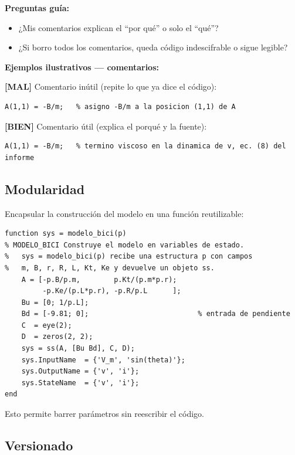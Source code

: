 \documentclass[11pt,a4paper]{article}
\newcommand{\malo}{\textcolor{red!70!black}{\textbf{[MAL]}}}
\newcommand{\bueno}{\textcolor{green!50!black}{\textbf{[BIEN]}}}
\begin{document}
\begin{guia}
\textbf{Preguntas guía:}
\begin{itemize}
    \item ¿Mis comentarios explican el ``por qué'' o solo el ``qué''?
    \item ¿Si borro todos los comentarios, queda código indescifrable o sigue legible?
\end{itemize}
\end{guia}

\begin{ejemplo}
\textbf{Ejemplos ilustrativos --- comentarios:}

\malo{} Comentario inútil (repite lo que ya dice el código):
\begin{lstlisting}[style=matlab]
A(1,1) = -B/m;   % asigno -B/m a la posicion (1,1) de A
\end{lstlisting}

\bueno{} Comentario útil (explica el porqué y la fuente):
\begin{lstlisting}[style=matlab]
A(1,1) = -B/m;   % termino viscoso en la dinamica de v, ec. (8) del informe
\end{lstlisting}
\end{ejemplo}

\subsection{Modularidad}

Encapsular la construcción del modelo en una función reutilizable:

\begin{lstlisting}[style=matlab]
function sys = modelo_bici(p)
% MODELO_BICI Construye el modelo en variables de estado.
%   sys = modelo_bici(p) recibe una estructura p con campos
%   m, B, r, R, L, Kt, Ke y devuelve un objeto ss.
    A = [-p.B/p.m,        p.Kt/(p.m*p.r);
         -p.Ke/(p.L*p.r), -p.R/p.L      ];
    Bu = [0; 1/p.L];
    Bd = [-9.81; 0];                          % entrada de pendiente
    C  = eye(2);
    D  = zeros(2, 2);
    sys = ss(A, [Bu Bd], C, D);
    sys.InputName  = {'V_m', 'sin(theta)'};
    sys.OutputName = {'v', 'i'};
    sys.StateName  = {'v', 'i'};
end
\end{lstlisting}

Esto permite barrer parámetros sin reescribir el código.

\subsection{Versionado}
\end{document}
